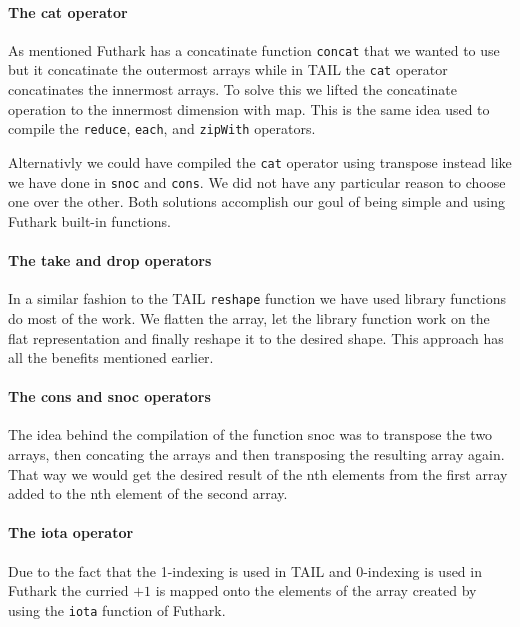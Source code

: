 \documentclass[11pt]{article}
\begin{document}
\paragraph{The cat operator} 
As mentioned Futhark has a concatinate function {\tt concat} that we wanted to use but it concatinate the outermost arrays while in TAIL the {\tt cat} operator concatinates the innermost arrays. To solve this we lifted the concatinate operation to the innermost dimension with map. This is the same idea used to compile the {\tt reduce}, {\tt each}, and {\tt zipWith} operators. 

Alternativly we could have compiled the {\tt cat} operator using transpose instead like we have done in {\tt snoc} and {\tt cons}. We did not have any particular reason to choose one over the other. Both solutions accomplish our goul of being simple and using Futhark built-in functions. 

\paragraph{The take and drop operators} 
In a similar fashion to the TAIL {\tt reshape} function we have used library functions do most of the work.
We flatten the array, let the library function work on the flat representation and finally reshape it to the desired shape.
This approach has all the benefits mentioned earlier.

\paragraph{The cons and snoc operators}
The idea behind the compilation of the function snoc was to transpose the two arrays, then concating the arrays and then transposing the resulting array again. That way we would get the desired result of the nth elements from the first array added to the nth element of the second array.\\

\paragraph{The iota operator} 
Due to the fact that the 1-indexing is used in TAIL and 0-indexing is used in Futhark the curried $+1$ is mapped onto the elements of the array created by using the {\tt iota} function of Futhark. 
\end{document}

